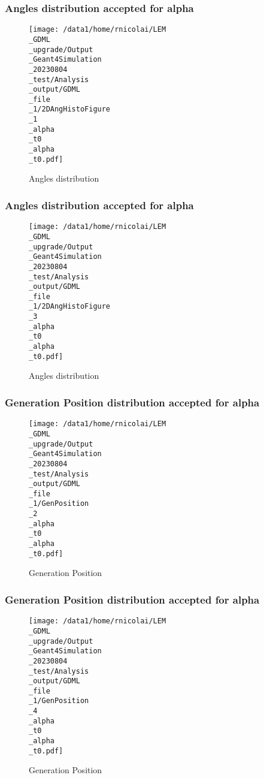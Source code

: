 \documentclass[8pt]{beamer}
\begin{document}
            \begin{frame}
                \frametitle{Angles distribution accepted for alpha}
            
        \begin{figure}[h]
            \centering
            \texttt{[image: /data1/home/rnicolai/LEM\\\_GDML\\\_upgrade/Output\\\_Geant4Simulation\\\_20230804\\\_test/Analysis\\\_output/GDML\\\_file\\\_1/2DAngHistoFigure\\\_1\\\_alpha\\\_t0\\\_alpha\\\_t0.pdf]}
            \caption{Angles distribution}
        \end{figure}
        
            \end{frame}
            
            \begin{frame}
                \frametitle{Angles distribution accepted for alpha}
            
        \begin{figure}[h]
            \centering
            \texttt{[image: /data1/home/rnicolai/LEM\\\_GDML\\\_upgrade/Output\\\_Geant4Simulation\\\_20230804\\\_test/Analysis\\\_output/GDML\\\_file\\\_1/2DAngHistoFigure\\\_3\\\_alpha\\\_t0\\\_alpha\\\_t0.pdf]}
            \caption{Angles distribution}
        \end{figure}
        
            \end{frame}
            
            \begin{frame}
                \frametitle{Generation Position distribution accepted for alpha}
            
        \begin{figure}[h]
            \centering
            \texttt{[image: /data1/home/rnicolai/LEM\\\_GDML\\\_upgrade/Output\\\_Geant4Simulation\\\_20230804\\\_test/Analysis\\\_output/GDML\\\_file\\\_1/GenPosition\\\_2\\\_alpha\\\_t0\\\_alpha\\\_t0.pdf]}
            \caption{Generation Position}
        \end{figure}
        
            \end{frame}
            
            \begin{frame}
                \frametitle{Generation Position distribution accepted for alpha}
            
        \begin{figure}[h]
            \centering
            \texttt{[image: /data1/home/rnicolai/LEM\\\_GDML\\\_upgrade/Output\\\_Geant4Simulation\\\_20230804\\\_test/Analysis\\\_output/GDML\\\_file\\\_1/GenPosition\\\_4\\\_alpha\\\_t0\\\_alpha\\\_t0.pdf]}
            \caption{Generation Position}
        \end{figure}
        
            \end{frame}
            
\end{document}
